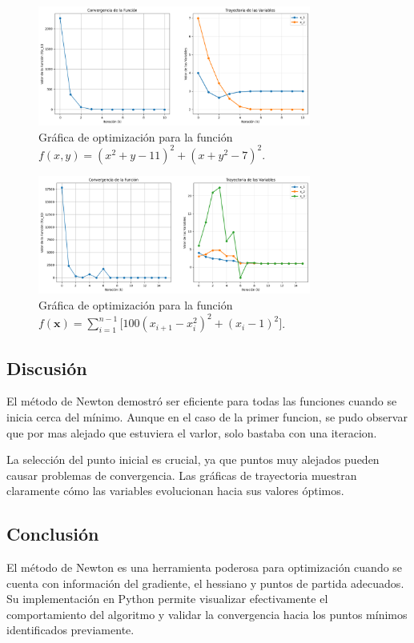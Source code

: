 \documentclass{article}
\begin{document}
\begin{figure}[h]
\centering
\includegraphics[width=0.8\textwidth]{images/10_2_plot.png}
\caption{Gráfica de optimización para la función $f(x,y) = (x^{2}+y-11)^{2} + (x+y^{2}-7)^{2}$.}
\label{fig:10_2_optim}
\end{figure}

\begin{figure}[h]
\centering
\includegraphics[width=0.8\textwidth]{images/10_3_plot.png}
\caption{Gráfica de optimización para la función $f(\mathbf{x}) = \sum_{i=1}^{n-1} \bigl[100(x_{i+1}-x_i^{2})^{2} + (x_i-1)^{2}\bigr]$.}
\label{fig:10_3_optim}
\end{figure}

\subsection{Discusión}

El método de Newton demostró ser eficiente para todas las funciones cuando se inicia cerca del mínimo. Aunque en el caso de la primer funcion, se pudo observar que por mas alejado que estuviera el varlor, solo bastaba con una iteracion.

La selección del punto inicial es crucial, ya que puntos muy alejados pueden causar problemas de convergencia. Las gráficas de trayectoria muestran claramente cómo las variables evolucionan hacia sus valores óptimos.

\subsection{Conclusión}

El método de Newton es una herramienta poderosa para optimización cuando se cuenta con información del gradiente, el hessiano y puntos de partida adecuados. Su implementación en Python permite visualizar efectivamente el comportamiento del algoritmo y validar la convergencia hacia los puntos mínimos identificados previamente.
\end{document}
